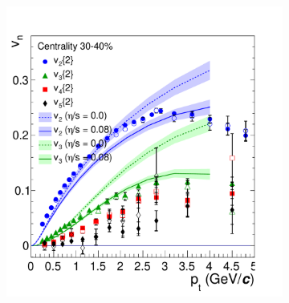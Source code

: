 \begin{figure}[tb]
	\centering
	\begin{subfigure}[t]{0.5\textwidth}
                \includegraphics[width=\textwidth]{figures/alice_vn_figa.pdf}
        \label{fig:higherharmonics}
        \end{subfigure}
        \quad
        \begin{subfigure}[t]{0.45\textwidth}

\end{subfigure}
\end{figure}
